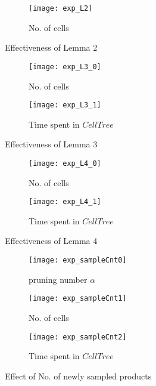 \begin{figure}[ht!]
  \centering
  \begin{subfigure}[b]{0.45\linewidth}
    \texttt{[image: exp\_L2]}
    \caption{No. of cells}
    \label{exp_L2_in}
  \end{subfigure}
  \caption{Effectiveness of Lemma 2}
  \label{exp_L2}
\end{figure}

\begin{figure}[ht!]
  \centering
  \begin{subfigure}[b]{0.45\linewidth}
    \texttt{[image: exp\_L3\_0]}
    \caption{No. of cells}
    \label{exp_L3_0}
  \end{subfigure}
  \begin{subfigure}[b]{0.45\linewidth}
    \texttt{[image: exp\_L3\_1]}
    \caption{Time spent in $CellTree$}
    \label{exp_L3_1}
  \end{subfigure}
  \caption{Effectiveness of Lemma 3}
  \label{exp_L3}
\end{figure}

\begin{figure}[ht!]
  \centering
  \begin{subfigure}[b]{0.45\linewidth}
    \texttt{[image: exp\_L4\_0]}
    \caption{No. of cells}
    \label{exp_L4_0}
  \end{subfigure}
  \begin{subfigure}[b]{0.45\linewidth}
    \texttt{[image: exp\_L4\_1]}
    \caption{Time spent in $CellTree$}
    \label{exp_L4_1}
  \end{subfigure}
  \caption{Effectiveness of Lemma 4}
  \label{exp_L4}
\end{figure}

\begin{figure}[ht!]
  \centering
  \begin{subfigure}[b]{0.45\linewidth}
    \texttt{[image: exp\_sampleCnt0]}
    \caption{pruning number $\alpha$}
    \label{newpdtcnt_on_alpha}
  \end{subfigure}
  \begin{subfigure}[b]{0.45\linewidth}
    \texttt{[image: exp\_sampleCnt1]}
    \caption{No. of cells}
    \label{newpdtcnt_on_cell}
  \end{subfigure}
  \begin{subfigure}[b]{0.45\linewidth}
    \texttt{[image: exp\_sampleCnt2]}
    \caption{Time spent in $CellTree$}
    \label{newpdtcnt_on_time}
  \end{subfigure}
  \caption{Effect of No. of newly sampled products}
  \label{lemma3_cnt}
\end{figure}

